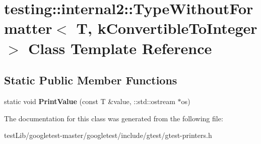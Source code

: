 \hypertarget{classtesting_1_1internal2_1_1TypeWithoutFormatter_3_01T_00_01kConvertibleToInteger_01_4}{}\section{testing\+:\+:internal2\+:\+:Type\+Without\+Formatter$<$ T, k\+Convertible\+To\+Integer $>$ Class Template Reference}
\label{classtesting_1_1internal2_1_1TypeWithoutFormatter_3_01T_00_01kConvertibleToInteger_01_4}
\subsection*{Static Public Member Functions}
\begin{DoxyCompactItemize}
\item 
\mbox{\label{classtesting_1_1internal2_1_1TypeWithoutFormatter_3_01T_00_01kConvertibleToInteger_01_4_ab27a411afb608e730a57d232b3f4f486}} 
static void {\bfseries Print\+Value} (const T \&value, \+::std\+::ostream $\ast$os)
\end{DoxyCompactItemize}


The documentation for this class was generated from the following file\+:\begin{DoxyCompactItemize}
\item 
test\+Lib/googletest-\/master/googletest/include/gtest/gtest-\/printers.\+h\end{DoxyCompactItemize}
